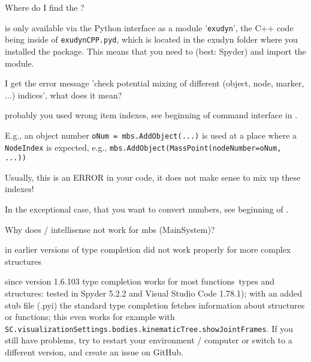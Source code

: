 \item Where do I find the ?
\bi
\item[$\ra$] \codeName is only available via the Python interface as a module '\texttt{exudyn}', the C++ code being inside of \texttt{exudynCPP.pyd}, which is located in the exudyn folder where you installed the package. This means that you need to  (best: Spyder) and import the \codeName module.
\ei
\item I get the error message 'check potential mixing of different (object, node, marker, ...) indices', what does it mean?
\bi
\item[$\ra$] probably you used wrong item indexes, see beginning of command interface in . 
\item[$\ra$] E.g., an object number \texttt{oNum = mbs.AddObject(...)} is used at a place where a \texttt{NodeIndex} is expected, e.g., \texttt{mbs.AddObject(MassPoint(nodeNumber=oNum, ...))}
\item[$\ra$] Usually, this is an ERROR in your code, it does not make sense to mix up these indexes!
\item[$\ra$] In the exceptional case, that you want to convert numbers, see beginning of .
\ei
\item Why does  / intellisense not work for mbs (MainSystem)?
\bi
\item[$\ra$] in earlier versions of \codeName type completion did not work properly for more complex structures
\item[$\ra$] since version 1.6.103 type completion works for most functions\, types and structures: tested in Spyder 5.2.2 and Visual Studio Code 1.78.1); with an added stub file (.pyi) the standard type completion fetches information about structures or functions; this even works for example with \texttt{SC.visualizationSettings.bodies.kinematicTree.showJointFrames}. If you still have problems, try to restart your environment / computer or switch to a different version, and create an issue on GitHub.
\ei
